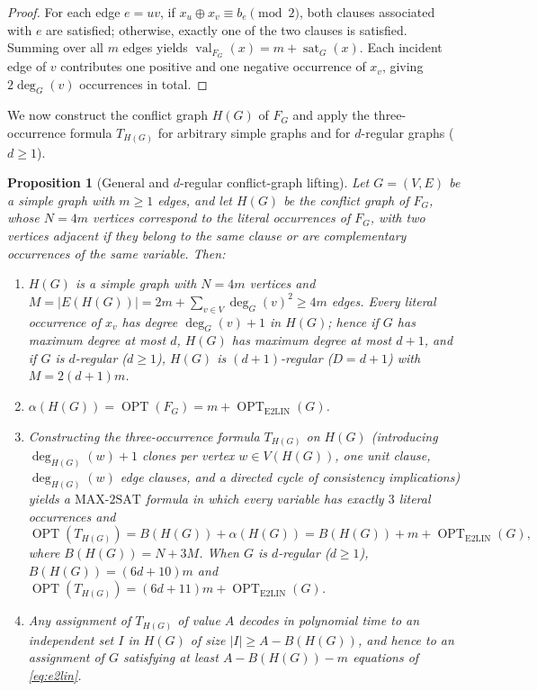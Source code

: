 \documentclass[pdflatex,sn-mathphys-num]{sn-jnl}%
\theoremstyle{thmstyleone}%
\newtheorem{Proposition}[Theorem]{Proposition}
\theoremstyle{thmstyletwo}%
\theoremstyle{thmstylethree}%
\begin{document}
\begin{proof}
For each edge $e=uv$, if $x_u \oplus x_v \equiv b_e \pmod{2}$, both clauses associated with $e$ are satisfied; otherwise, exactly one of the two clauses is satisfied. Summing over all $m$ edges yields $\operatorname{val}_{F_G}(x) = m + \operatorname{sat}_G(x)$. Each incident edge of $v$ contributes one positive and one negative occurrence of $x_v$, giving $2\deg_G(v)$ occurrences in total.
\end{proof}

We now construct the conflict graph $H(G)$ of $F_G$ and apply the three-occurrence formula $T_{H(G)}$ for arbitrary simple graphs and for $d$-regular graphs ($d \ge 1$).

\begin{Proposition}[General and $d$-regular conflict-graph lifting]\label{prop:conflict}
Let $G=(V,E)$ be a simple graph with $m \ge 1$ edges, and let $H(G)$ be the conflict graph of $F_G$, whose $N=4m$ vertices correspond to the literal occurrences of $F_G$, with two vertices adjacent if they belong to the same clause or are complementary occurrences of the same variable. Then:
\begin{enumerate}
\item $H(G)$ is a simple graph with $N=4m$ vertices and $M = |E(H(G))| = 2m + \sum_{v\in V} \deg_G(v)^2 \ge 4m$ edges. Every literal occurrence of $x_v$ has degree $\deg_G(v)+1$ in $H(G)$; hence if $G$ has maximum degree at most $d$, $H(G)$ has maximum degree at most $d+1$, and if $G$ is $d$-regular ($d \ge 1$), $H(G)$ is $(d+1)$-regular ($D = d+1$) with $M = 2(d+1)m$.
\item $\alpha(H(G)) = \operatorname{OPT}(F_G) = m + \operatorname{OPT}_{\mathrm{E2LIN}}(G)$.
\item Constructing the three-occurrence formula $T_{H(G)}$ on $H(G)$ (introducing $\deg_{H(G)}(w)+1$ clones per vertex $w \in V(H(G))$, one unit clause, $\deg_{H(G)}(w)$ edge clauses, and a directed cycle of consistency implications) yields a $\mathrm{MAX\text{-}2SAT}$ formula in which every variable has exactly $3$ literal occurrences and
\[
\operatorname{OPT}(T_{H(G)}) = B(H(G)) + \alpha(H(G)) = B(H(G)) + m + \operatorname{OPT}_{\mathrm{E2LIN}}(G),
\]
where $B(H(G)) = N + 3M$. When $G$ is $d$-regular ($d \ge 1$), $B(H(G)) = (6d+10)m$ and $\operatorname{OPT}(T_{H(G)}) = (6d+11)m + \operatorname{OPT}_{\mathrm{E2LIN}}(G)$.
\item Any assignment of $T_{H(G)}$ of value $A$ decodes in polynomial time to an independent set $I$ in $H(G)$ of size $|I| \ge A - B(H(G))$, and hence to an assignment of $G$ satisfying at least $A - B(H(G)) - m$ equations of \eqref{eq:e2lin}.
\end{enumerate}
\end{Proposition}
\end{document}
